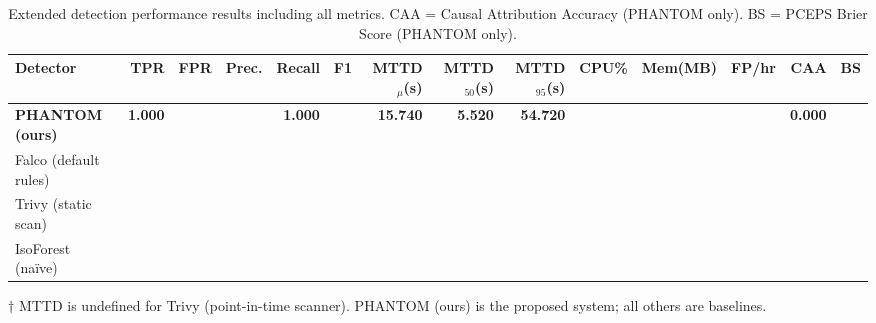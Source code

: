 \begin{table}[h]
\centering
\caption{Extended detection performance results including all metrics. CAA = Causal Attribution Accuracy (PHANTOM only). BS = PCEPS Brier Score (PHANTOM only).}
\label{tab:detection_performance_extended}
\begin{tabular}{lrrrrrrrrrrrrr}
\hline
Detector & TPR & FPR & Prec. & Recall & F1 & MTTD$_\mu$(s) & MTTD$_{50}$(s) & MTTD$_{95}$(s) & CPU\% & Mem(MB) & FP/hr & CAA & BS \\
\hline
\textbf{PHANTOM (ours)} & \textbf{1.000} & \text{---} & \text{---} & \textbf{1.000} & \text{---} & \textbf{15.740} & \textbf{5.520} & \textbf{54.720} & \text{---} & \text{---} & \text{---} & \textbf{0.000} & \text{---} \\
Falco (default rules) & \text{---} & \text{---} & \text{---} & \text{---} & \text{---} & \text{---} & \text{---} & \text{---} & \text{---} & \text{---} & \text{---} & \text{---} & \text{---} \\
Trivy (static scan) & \text{---} & \text{---} & \text{---} & \text{---} & \text{---} & \text{---} & \text{---} & \text{---} & \text{---} & \text{---} & \text{---} & \text{---} & \text{---} \\
IsoForest (na\"{i}ve) & \text{---} & \text{---} & \text{---} & \text{---} & \text{---} & \text{---} & \text{---} & \text{---} & \text{---} & \text{---} & \text{---} & \text{---} & \text{---} \\
\hline
\end{tabular}
\vspace{0.5em}
\footnotesize{$\dagger$ MTTD is undefined for Trivy (point-in-time scanner). PHANTOM (ours) is the proposed system; all others are baselines.}
\end{table}